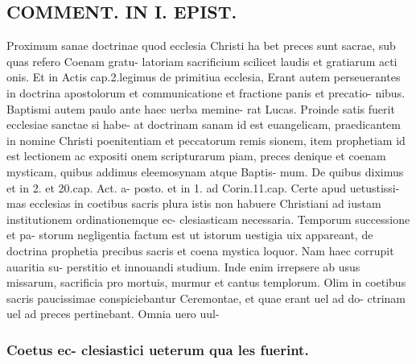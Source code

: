 \documentclass{article}
\begin{document}
\begin{pages}
\section*{COMMENT. IN I. EPIST. }\pstart Proximum sanae doctrinae quod ecclesia Christi ha bet preces sunt sacrae, sub quas refero Coenam gratu- latoriam sacrificium scilicet laudis et gratiarum acti onis. Et in Actis cap.2.legimus de primitiua ecclesia, Erant autem perseuerantes in doctrina apostolorum et communicatione et fractione panis et precatio- nibus. Baptismi autem paulo ante haec uerba memine- rat Lucas. Proinde satis fuerit ecclesiae sanctae si habe- at doctrinam sanam id est euangelicam, praedicantem in nomine Christi poenitentiam et peccatorum remis sionem, item prophetiam id est lectionem ac expositi onem scripturarum piam, preces denique et coenam mysticam, quibus addimus eleemosynam atque Baptis- mum. De quibus diximus et in 2. et 20.cap. Act. a- posto. et in 1. ad Corin.11.cap. Certe apud uetustissi- mas ecclesias in coetibus sacris plura istis non habuere Christiani ad iustam institutionem ordinationemque ec- clesiasticam necessaria. Temporum successione et pa- storum negligentia factum est ut istorum uestigia uix appareant, de doctrina prophetia precibus sacris et coena mystica loquor. Nam haec corrupit auaritia su- perstitio et innouandi studium. Inde enim irrepsere ab usus missarum, sacrificia pro mortuis, murmur et cantus templorum. Olim in coetibus sacris paucissimae conspiciebantur Ceremontae, et quae erant uel ad do- ctrinam uel ad preces pertinebant. Omnia uero uul-  \pend
\subsubsection*{Coetus ec- clesiastici ueterum qua les fuerint. }

\end{pages}
\end{document}
